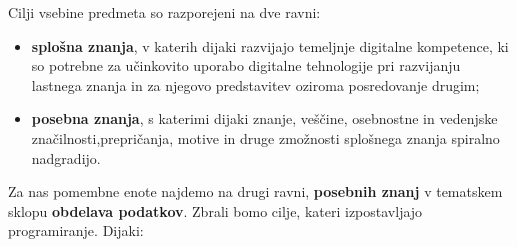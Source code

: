 Cilji vsebine predmeta so razporejeni na dve ravni:

\begin{itemize}
\item \textbf{splošna znanja}, v katerih dijaki razvijajo temeljnje
  digitalne kompetence, ki so potrebne za učinkovito uporabo digitalne
  tehnologije pri razvijanju lastnega znanja in za njegovo
  predstavitev oziroma posredovanje drugim;
\item \textbf{posebna znanja}, s katerimi dijaki znanje, veščine,
  osebnostne in vedenjske značilnosti,prepričanja, motive in druge
  zmožnosti splošnega znanja spiralno nadgradijo.
\end{itemize}

Za nas pomembne enote najdemo na drugi ravni, \textbf{posebnih znanj}
v tematskem sklopu \textbf{obdelava podatkov}. Zbrali bomo cilje,
kateri izpostavljajo programiranje. Dijaki:

